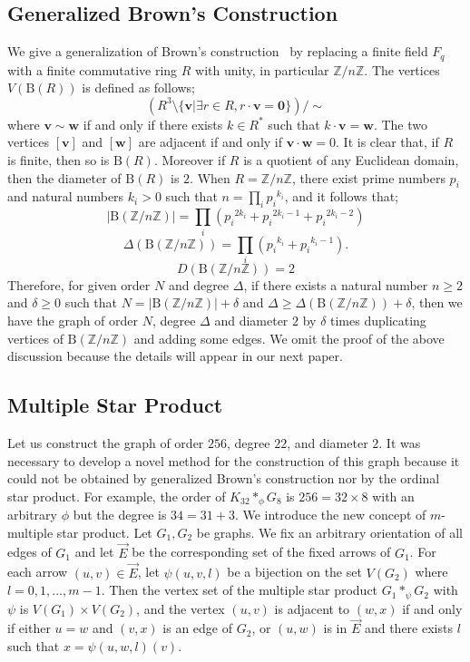\documentclass[conference]{IEEEtran}
\newcommand{\Z}{\mathbb Z}
\newcommand{\B}{\mathrm{B}}
\begin{document}
\subsection{Generalized Brown's Construction}
We give a generalization of Brown's construction~\cite{gbc} by replacing a finite field $F_q$ with a finite commutative ring $R$ with unity, in particular $\Z/n\Z$.
The vertices $V(\B(R))$ is defined as follows;
\[( R^3 \setminus \{\bm v | \exists r \in R, r \cdot {\bm v} = {\bm 0} \} ) / \sim\]
where $\bm v \sim \bm w$ if and only if there exists $k \in R^*$ such that $k \cdot {\bm v} = {\bm w}$.
The two vertices $[\bm v]$ and $[\bm w]$ are adjacent if and only if ${\bm v} \cdot {\bm w} = 0$.
It is clear that, if $R$ is finite, then so is $\B(R)$.
Moreover if $R$ is a quotient of any Euclidean domain, then the diameter of $\B(R)$ is $2$.
When $R=\Z/n\Z$, there exist prime numbers $p_i$ and natural numbers $k_i > 0$ such that $n=\prod_{i} {p_i}^{k_i}$,
and it follows that;
\[ |\B(\Z/n\Z)| = \prod_i \left( {p_i}^{2k_i}+{p_i}^{2k_i-1}+{p_i}^{2k_i-2} \right)\]
\[ \Delta(\B(\Z/n\Z)) = \prod_i \left( {p_i}^{k_i} + {p_i}^{k_i-1} \right). \]
\[ D(\B(\Z/n\Z)) = 2\]
Therefore, for given order $N$ and degree $\Delta$, if there exists a natural number $n \geq 2$ and $\delta \geq 0$
such that $N=|\B(\Z/n\Z)|+\delta$ and $\Delta \geq \Delta(\B(\Z/n\Z))+\delta$, 
then we have the graph of order $N$, degree $\Delta$ and diameter $2$
by $\delta$ times duplicating vertices of $\B(\Z/n\Z)$ and adding some edges.
We omit the proof of the above discussion because the details will appear in our next paper\cite{nextpaper}.

\subsection{Multiple Star Product}
Let us construct the graph of order $256$, degree $22$, and diameter $2$.
It was necessary to develop a novel method for the construction of this graph because it could not be obtained by generalized Brown's construction nor by the ordinal star product.
For example, the order of $K_{32} *_\phi G_8$ is $256=32 \times 8$ with an arbitrary $\phi$ but the degree is $34=31+3$.
We introduce the new concept of $m$-multiple star product.
Let $G_1, G_2$ be graphs.
We fix an arbitrary orientation of all edges of $G_1$ and let $\vec{E}$ be the corresponding set of the fixed arrows of $G_1$.
For each arrow $(u,v) \in \vec{E}$, let $\psi(u,v,l)$ be a bijection on the set $V(G_2)$ where $l=0,1,\ldots,m-1$.
Then the vertex set of the multiple star product $G_1 *_\psi G_2$ with $\psi$ is $V(G_1) \times V(G_2)$,
and the vertex $(u, v)$ is adjacent to $(w, x)$ if and only if either $u = w$ and $(v,x)$ is an edge of $G_2$, or
$(u, w)$ is in $\vec{E}$ and there exists $l$ such that $x=\psi(u,w,l)(v)$.
\end{document}
